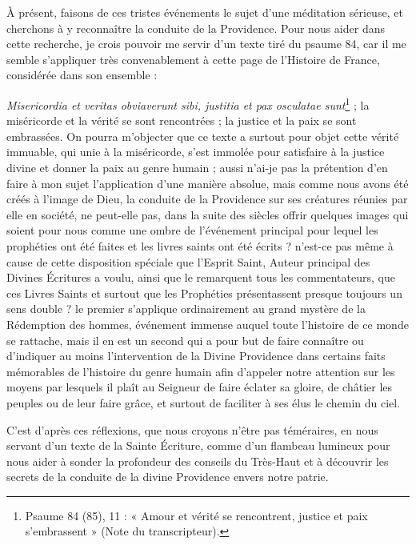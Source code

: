 \documentclass[11pt,a4paper]{report}
\begin{document}
À présent, faisons de ces tristes événements le sujet d'une méditation sérieuse, et cherchons à y reconnaître la conduite de la Providence. Pour nous aider dans cette recherche, je crois pouvoir me servir d'un texte tiré du psaume 84, car il me semble s'appliquer très convenablement à cette page de l'Histoire de France, considérée dans son ensemble :

\textit{Misericordia et veritas obviaverunt sibi, justitia et pax osculatae sunt}\footnote{Psaume 84 (85), 11 : « Amour et vérité se rencontrent, justice et paix s'embrassent » (Note du transcripteur).} ; la miséricorde et la vérité se sont rencontrées ; la justice et la paix se sont embrassées. On pourra m'objecter que ce texte a surtout pour objet cette vérité immuable, qui unie à la miséricorde, s'est immolée pour satisfaire à la justice divine et donner la paix au genre humain ; aussi n'ai-je pas la prétention d'en faire à mon sujet l'application d'une manière absolue, mais comme nous avons été créés à l'image de Dieu, la conduite de la Providence sur ses créatures réunies par elle en société, ne peut-elle pas, dans la suite des siècles offrir quelques images qui soient pour nous comme une ombre de l'événement principal pour lequel les prophéties ont été faites et les livres saints ont été écrits ? n'est-ce pas même à cause de cette disposition spéciale que l'Esprit Saint, Auteur principal des Divines Écritures a voulu, ainsi que le remarquent tous les commentateurs, que ces Livres Saints et surtout que les Prophéties présentassent presque toujours un sens double ? le premier s'applique ordinairement au grand mystère de la Rédemption des hommes, événement immense auquel toute l'histoire de ce monde se rattache, mais il en est un second qui a pour but de faire connaître ou d'indiquer au moins l'intervention de la Divine Providence dans certains faits mémorables de l'histoire du genre humain afin d'appeler notre attention sur les moyens par lesquels il plaît au Seigneur de faire éclater sa gloire, de châtier les peuples ou de leur faire grâce, et surtout de faciliter à ses élus le chemin du ciel.

C'est d'après ces réflexions, que nous croyons n'être pas téméraires, en nous servant d'un texte de la Sainte Écriture, comme d'un flambeau lumineux pour nous aider à sonder la profondeur des conseils du Très-Haut et à découvrir les secrets de la conduite de la divine Providence envers notre patrie.
\end{document}
